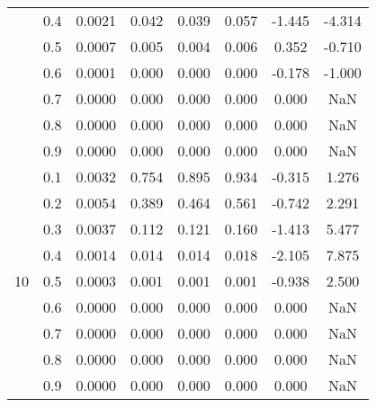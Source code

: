 \documentclass[11pt,a4paper]{report}
\begin{document}
\begin{longtable}{ | c | c || c | c | c | c | c | c | }
 & 0.4 & 0.0021 & 0.042 & 0.039 & 0.057 & -1.445 & -4.314 \\
 & 0.5 & 0.0007 & 0.005 & 0.004 & 0.006 & 0.352 & -0.710 \\
 & 0.6 & 0.0001 & 0.000 & 0.000 & 0.000 & -0.178 & -1.000 \\
 & 0.7 & 0.0000 & 0.000 & 0.000 & 0.000 & 0.000 & NaN \\
 & 0.8 & 0.0000 & 0.000 & 0.000 & 0.000 & 0.000 & NaN \\
 & 0.9 & 0.0000 & 0.000 & 0.000 & 0.000 & 0.000 & NaN \\
 \hline
\multirow{9}{*}{10} & 0.1 & 0.0032 & 0.754 & 0.895 & 0.934 & -0.315 & 1.276 \\
 & 0.2 & 0.0054 & 0.389 & 0.464 & 0.561 & -0.742 & 2.291 \\
 & 0.3 & 0.0037 & 0.112 & 0.121 & 0.160 & -1.413 & 5.477 \\
 & 0.4 & 0.0014 & 0.014 & 0.014 & 0.018 & -2.105 & 7.875 \\
 & 0.5 & 0.0003 & 0.001 & 0.001 & 0.001 & -0.938 & 2.500 \\
 & 0.6 & 0.0000 & 0.000 & 0.000 & 0.000 & 0.000 & NaN \\
 & 0.7 & 0.0000 & 0.000 & 0.000 & 0.000 & 0.000 & NaN \\
 & 0.8 & 0.0000 & 0.000 & 0.000 & 0.000 & 0.000 & NaN \\
 & 0.9 & 0.0000 & 0.000 & 0.000 & 0.000 & 0.000 & NaN \\
 \hline
\hline
\end{longtable}
\end{document}
